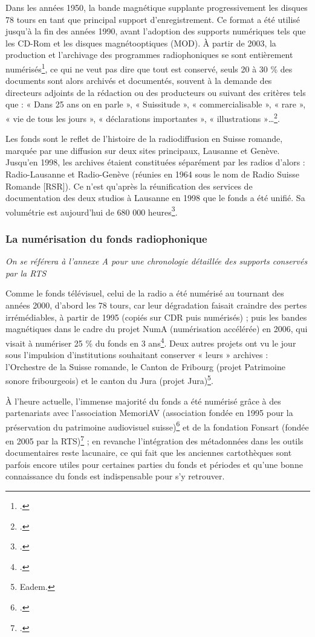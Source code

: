 Dans les années 1950, la bande magnétique supplante progressivement les disques 78 tours en tant que principal support d’enregistrement. Ce format a été utilisé jusqu’à la fin des années 1990, avant l’adoption des supports numériques tels que les CD-Rom et les disques magnétooptiques (MOD). À partir de 2003, la production et l’archivage des programmes radiophoniques se sont entièrement numérisés\footcite[p. 27]{prongue2009}, ce qui ne veut pas dire que tout est conservé, seuls 20 à 30 \% des documents sont alors archivés et documentés, souvent à la demande des directeurs adjoints de la rédaction ou des producteurs ou suivant des critères tels que : « Dans 25 ans on en parle », « Suissitude », « commercialisable », « rare », « vie de tous les jours », « déclarations importantes », « illustrations »…\footcite{meuret2024}.

Les fonds sont le reflet de l’histoire de la radiodiffusion en Suisse romande, marquée par une diffusion sur deux sites principaux, Lausanne et Genève. Jusqu’en 1998, les archives étaient constituées séparément par les radios d’alors : Radio-Lausanne et Radio-Genève (réunies en 1964 sous le nom de Radio Suisse Romande [RSR]). Ce n’est qu’après la réunification des services de documentation des deux studios à Lausanne en 1998 que le fonds a été unifié. Sa volumétrie est aujourd’hui de 680 000 heures\footcite{sonderegger2024}.

\subsubsection{La numérisation du fonds radiophonique}
\textit{On se référera à l’annexe A pour une chronologie détaillée des supports conservés par la RTS}

Comme le fonds télévisuel, celui de la radio a été numérisé au tournant des années 2000, d’abord les 78 tours, car leur dégradation faisait craindre des pertes irrémédiables, à partir de 1995 (copiés sur CDR puis numérisés) ; puis les bandes magnétiques dans le cadre du projet NumA (numérisation accélérée) en 2006, qui visait à numériser 25 \% du fonds en 3 ans\footcite[p. 20]{prongue2009}. Deux autres projets ont vu le jour sous l’impulsion d’institutions souhaitant conserver « leurs » archives : l’Orchestre de la Suisse romande, le Canton de Fribourg (projet Patrimoine sonore fribourgeois) et le canton du Jura (projet Jura)\footnote{Eadem.}.

À l’heure actuelle, l’immense majorité du fonds a été numérisé grâce à des partenariats avec l’association MemoriAV (association fondée en 1995 pour la préservation du patrimoine audiovisuel suisse)\footcite{zotero-254} et de la fondation Fonsart (fondée en 2005 par la RTS)\footcite{freudiguer2024} ; en revanche l’intégration des métadonnées dans les outils documentaires reste lacunaire, ce qui fait que les anciennes cartothèques sont parfois encore utiles pour certaines parties du fonds et périodes et qu’une bonne connaissance du fonds est indispensable pour s’y retrouver.


